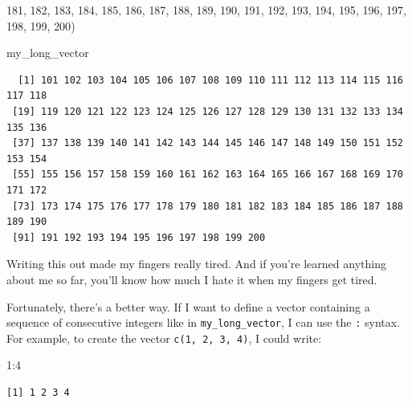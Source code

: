 \documentclass[
  letterpaper,
  DIV=11,
  numbers=noendperiod]{scrreprt}
\newenvironment{Shaded}{\begin{snugshade}}{\end{snugshade}}
\newcommand{\DecValTok}[1]{\textcolor[rgb]{0.68,0.00,0.00}{#1}}
\newcommand{\NormalTok}[1]{\textcolor[rgb]{0.00,0.23,0.31}{#1}}
\newcommand{\SpecialCharTok}[1]{\textcolor[rgb]{0.37,0.37,0.37}{#1}}
\begin{document}
\begin{Shaded}
\begin{Highlighting}[]
                    \DecValTok{181}\NormalTok{, }\DecValTok{182}\NormalTok{, }\DecValTok{183}\NormalTok{, }\DecValTok{184}\NormalTok{, }\DecValTok{185}\NormalTok{, }\DecValTok{186}\NormalTok{, }\DecValTok{187}\NormalTok{, }\DecValTok{188}\NormalTok{, }\DecValTok{189}\NormalTok{, }\DecValTok{190}\NormalTok{, }
                    \DecValTok{191}\NormalTok{, }\DecValTok{192}\NormalTok{, }\DecValTok{193}\NormalTok{, }\DecValTok{194}\NormalTok{, }\DecValTok{195}\NormalTok{, }\DecValTok{196}\NormalTok{, }\DecValTok{197}\NormalTok{, }\DecValTok{198}\NormalTok{, }\DecValTok{199}\NormalTok{, }\DecValTok{200}\NormalTok{)}
\end{Highlighting}
\end{Shaded}

\begin{Shaded}
\begin{Highlighting}[]
\NormalTok{my\_long\_vector}
\end{Highlighting}
\end{Shaded}

\begin{verbatim}
  [1] 101 102 103 104 105 106 107 108 109 110 111 112 113 114 115 116 117 118
 [19] 119 120 121 122 123 124 125 126 127 128 129 130 131 132 133 134 135 136
 [37] 137 138 139 140 141 142 143 144 145 146 147 148 149 150 151 152 153 154
 [55] 155 156 157 158 159 160 161 162 163 164 165 166 167 168 169 170 171 172
 [73] 173 174 175 176 177 178 179 180 181 182 183 184 185 186 187 188 189 190
 [91] 191 192 193 194 195 196 197 198 199 200
\end{verbatim}

Writing this out made my fingers really tired. And if you're learned
anything about me so far, you'll know how much I hate it when my fingers
get tired.

Fortunately, there's a better way. If I want to define a vector
containing a sequence of consecutive integers like in
\texttt{my\_long\_vector}, I can use the \texttt{:} syntax. For example,
to create the vector \texttt{c(1,\ 2,\ 3,\ 4)}, I could write:

\begin{Shaded}
\begin{Highlighting}[]
\DecValTok{1}\SpecialCharTok{:}\DecValTok{4}
\end{Highlighting}
\end{Shaded}

\begin{verbatim}
[1] 1 2 3 4
\end{verbatim}
\end{document}
